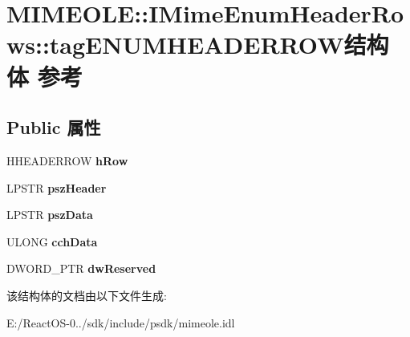 \hypertarget{struct_m_i_m_e_o_l_e_1_1_i_mime_enum_header_rows_1_1tag_e_n_u_m_h_e_a_d_e_r_r_o_w}{}\section{M\+I\+M\+E\+O\+LE\+:\+:I\+Mime\+Enum\+Header\+Rows\+:\+:tag\+E\+N\+U\+M\+H\+E\+A\+D\+E\+R\+R\+O\+W结构体 参考}
\label{struct_m_i_m_e_o_l_e_1_1_i_mime_enum_header_rows_1_1tag_e_n_u_m_h_e_a_d_e_r_r_o_w}
\subsection*{Public 属性}
\begin{DoxyCompactItemize}
\item 
\mbox{\label{struct_m_i_m_e_o_l_e_1_1_i_mime_enum_header_rows_1_1tag_e_n_u_m_h_e_a_d_e_r_r_o_w_ad096372911378025940b11f7ac34a38d}} 
H\+H\+E\+A\+D\+E\+R\+R\+OW {\bfseries h\+Row}
\item 
\mbox{\label{struct_m_i_m_e_o_l_e_1_1_i_mime_enum_header_rows_1_1tag_e_n_u_m_h_e_a_d_e_r_r_o_w_ac31410136243a136df91f666c800e37b}} 
L\+P\+S\+TR {\bfseries psz\+Header}
\item 
\mbox{\label{struct_m_i_m_e_o_l_e_1_1_i_mime_enum_header_rows_1_1tag_e_n_u_m_h_e_a_d_e_r_r_o_w_abfd31fd2fbfb7347273c0cff360f3417}} 
L\+P\+S\+TR {\bfseries psz\+Data}
\item 
\mbox{\label{struct_m_i_m_e_o_l_e_1_1_i_mime_enum_header_rows_1_1tag_e_n_u_m_h_e_a_d_e_r_r_o_w_a957d6339cd3dbd2defebcda1d2725565}} 
U\+L\+O\+NG {\bfseries cch\+Data}
\item 
\mbox{\label{struct_m_i_m_e_o_l_e_1_1_i_mime_enum_header_rows_1_1tag_e_n_u_m_h_e_a_d_e_r_r_o_w_aff9dd50bee1cb4f08eb0438233832663}} 
D\+W\+O\+R\+D\+\_\+\+P\+TR {\bfseries dw\+Reserved}
\end{DoxyCompactItemize}


该结构体的文档由以下文件生成\+:\begin{DoxyCompactItemize}
\item 
E\+:/\+React\+O\+S-\/0../sdk/include/psdk/mimeole.\+idl\end{DoxyCompactItemize}
